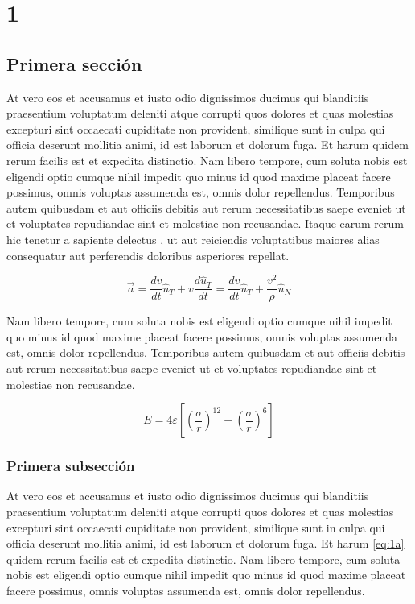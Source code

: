 \chapter{1}


\section{Primera sección}

At vero eos et accusamus et iusto odio dignissimos ducimus 
qui blanditiis praesentium voluptatum deleniti atque corrupti 
quos dolores et quas molestias excepturi sint occaecati cupiditate 
non provident, similique sunt in culpa qui officia deserunt mollitia animi, 
id est laborum et dolorum fuga. Et harum quidem rerum facilis est et expedita 
distinctio. Nam libero tempore, cum soluta nobis est eligendi optio cumque 
nihil impedit quo minus id quod maxime placeat facere possimus, omnis voluptas 
assumenda est, omnis dolor repellendus. Temporibus autem \cite{Bellomo2000} quibusdam et aut 
officiis debitis aut rerum necessitatibus saepe eveniet ut et voluptates 
repudiandae sint et molestiae non recusandae. Itaque earum rerum hic 
tenetur a sapiente delectus \cite{Arfken2005}, ut aut reiciendis voluptatibus maiores 
alias consequatur aut perferendis doloribus asperiores repellat.

\begin{equation}\label{eq:1a}
	\vec {a} = {\frac{{dv}}{{dt}}}\hat {u}_{T} + v{\frac{{d\hat{u}_{T} }}{{dt}}} = 
			   {\frac{{dv}}{{dt}}}\hat {u}_{T} + {\frac{{v^{2}}}{{\rho}} }\hat {u}_{N}
\end{equation}

Nam libero tempore, cum soluta nobis est eligendi optio cumque 
nihil impedit quo minus id quod maxime placeat facere possimus, omnis voluptas 
assumenda est, omnis dolor repellendus. Temporibus autem quibusdam et aut 
officiis debitis aut rerum necessitatibus saepe eveniet ut et voluptates 
repudiandae sint et molestiae non recusandae.

\begin{equation*}
	E = 4\varepsilon \left[ \left( \frac{\sigma}{r} \right)^{12} -
							\left( \frac{\sigma}{r} \right)^{6} \right]
\end{equation*}
			
\subsection{Primera subsección}

At vero eos et accusamus et iusto odio dignissimos ducimus 
qui blanditiis praesentium voluptatum deleniti atque corrupti 
quos dolores et quas molestias excepturi sint occaecati cupiditate 
non provident, similique sunt in culpa qui officia deserunt mollitia animi, 
id est laborum et dolorum fuga. Et harum \eqref{eq:1a} quidem rerum facilis est et expedita 
distinctio. Nam libero tempore, cum soluta nobis est eligendi optio cumque 
nihil impedit quo minus id quod maxime placeat facere possimus, omnis voluptas 
assumenda est, omnis dolor repellendus. 

